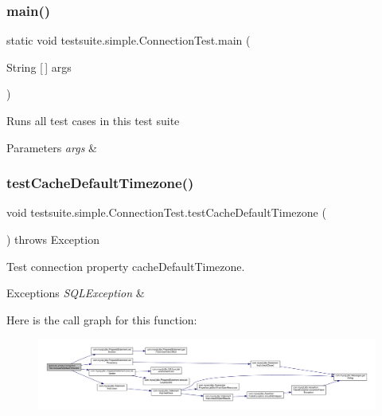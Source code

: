 \subsubsection{\texorpdfstring{main()}{main()}}
{\footnotesize\ttfamily static void testsuite.\+simple.\+Connection\+Test.\+main (\begin{DoxyParamCaption}\item[{String \mbox{[}$\,$\mbox{]}}]{args }\end{DoxyParamCaption})\hspace{0.3cm}{\ttfamily [static]}}

Runs all test cases in this test suite


\begin{DoxyParams}{Parameters}
{\em args} & \\
\hline
\end{DoxyParams}
\mbox{\label{classtestsuite_1_1simple_1_1_connection_test_a88325894a5bef7fc0239d8af082ede7f}} 
\subsubsection{\texorpdfstring{test\+Cache\+Default\+Timezone()}{testCacheDefaultTimezone()}}
{\footnotesize\ttfamily void testsuite.\+simple.\+Connection\+Test.\+test\+Cache\+Default\+Timezone (\begin{DoxyParamCaption}{ }\end{DoxyParamCaption}) throws Exception}

Test connection property cache\+Default\+Timezone.


\begin{DoxyExceptions}{Exceptions}
{\em S\+Q\+L\+Exception} & \\
\hline
\end{DoxyExceptions}
Here is the call graph for this function\+:
\nopagebreak
\begin{figure}[H]
\begin{center}
\leavevmode
\includegraphics[width=350pt]{classtestsuite_1_1simple_1_1_connection_test_a88325894a5bef7fc0239d8af082ede7f_cgraph}
\end{center}
\end{figure}
\mbox{\label{classtestsuite_1_1simple_1_1_connection_test_a272c1a4280b551be2feb88f3995878b0}} 

